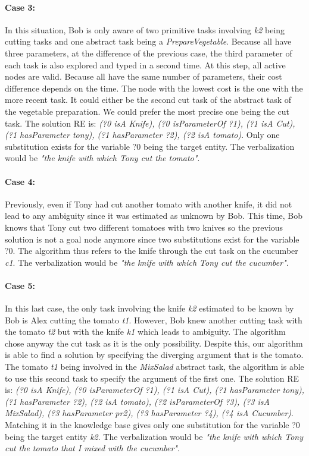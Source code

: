 \paragraph{Case 3:} In this situation, Bob is only aware of two primitive tasks involving \textit{k2} being cutting tasks and one abstract task being a \textit{PrepareVegetable}. Because all have three parameters, at the difference of the previous case, the third parameter of each task is also explored and typed in a second time. At this step, all active nodes are valid. Because all have the same number of parameters, their cost difference depends on the time. The node with the lowest cost is the one with the more recent task. It could either be the second cut task of the abstract task of the vegetable preparation. We could prefer the most precise one being the cut task. The solution RE is: \textit{(?0 isA Knife), (?0 isParameterOf ?1), (?1 isA Cut), (?1 hasParameter tony), (?1 hasParameter ?2), (?2 isA tomato)}. Only one substitution exists for the variable ?0 being the target entity. The verbalization would be \textit{"the knife with which Tony cut the tomato"}.

\paragraph{Case 4:} Previously, even if Tony had cut another tomato with another knife, it did not lead to any ambiguity since it was estimated as unknown by Bob. This time, Bob knows that Tony cut two different tomatoes with two knives so the previous solution is not a goal node anymore since two substitutions exist for the variable ?0. The algorithm thus refers to the knife through the cut task on the cucumber \textit{c1}. The verbalization would be \textit{"the knife with which Tony cut the cucumber"}.

\paragraph{Case 5:} In this last case, the only task involving the knife \textit{k2} estimated to be known by Bob is Alex cutting the tomato \textit{t1}. However, Bob knew another cutting task with the tomato \textit{t2} but with the knife \textit{k1} which leads to ambiguity. The algorithm chose anyway the cut task as it is the only possibility. Despite this, our algorithm is able to find a solution by specifying the diverging argument that is the tomato. The tomato \textit{t1} being involved in the \textit{MixSalad} abstract task, the algorithm is able to use this second task to specify the argument of the first one. The solution RE is: \textit{(?0 isA Knife), (?0 isParameterOf ?1), (?1 isA Cut), (?1 hasParameter tony), (?1 hasParameter ?2), (?2 isA tomato), (?2 isParameterOf ?3), (?3 isA MixSalad), (?3 hasParameter pr2), (?3 hasParameter ?4), (?4 isA Cucumber)}. Matching it in the knowledge base gives only one substitution for the variable ?0 being the target entity \textit{k2}. The verbalization would be \textit{"the knife with which Tony cut the tomato that I mixed with the cucumber"}.

